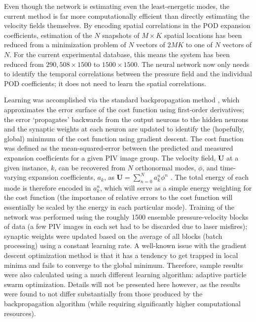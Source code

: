 Even though the network is estimating even the least-energetic modes, the current method is far more computationally efficient than directly estimating the velocity fields themselves.
By encoding spatial correlations in the POD expansion coefficients, estimation of the $N$ snapshots of $M \times K$ spatial locations has been reduced from a minimization problem of $N$ vectors of $2MK$ to one of $N$ vectors of $N$.
For the current experimental database, this means the system has been reduced from $290,508 \times 1500$ to $1500 \times 1500$.
The neural network now only needs to identify the temporal correlations between the pressure field and the individual POD coefficients; it does not need to learn the spatial correlations.

Learning was accomplished via the standard backpropagation method \citep{Haykin1994}, which approximates the error surface of the cost function using first-order derivatives; the error `propagates' backwards from the output neurons to the hidden neurons and the synaptic weights at each neuron are updated to identify the (hopefully, global) minimum of the cost function using gradient descent.
The cost function was defined as the mean-squared-error between the predicted and measured expansion coefficients for a given PIV image group.
The velocity field, $\mathbf{U}$ at a given instance, $k$, can be recovered from $N$ orthonormal modes, $\phi$, and time-varying expansion coefficients, $a_k$, as $\mathbf{U} = \sum_{n=0}^{N} a_{k}^{n} \phi^n$ \citep{Berkooz1993}.
The total energy of each mode is therefore encoded in $a_k^n$, which will serve as a simple energy weighting for the cost function (the importance of relative errors to the cost function will essentially be scaled by the energy in each particular mode).
Training of the network was performed using the roughly 1500 ensemble pressure-velocity blocks of data (a few PIV images in each set had to be discarded due to laser misfires); synaptic weights were updated based on the average of all blocks (batch processing) using a constant learning rate.
A well-known issue with the gradient descent optimization method is that it has a tendency to get trapped in local minima and fails to converge to the global minimum.
Therefore, sample results were also calculated using a much different learning algorithm: adaptive particle swarm optimization.
Details will not be presented here however, as the results were found to not differ substantially from those produced by the backpropagation algorithm (while requiring significantly higher computational resources).


